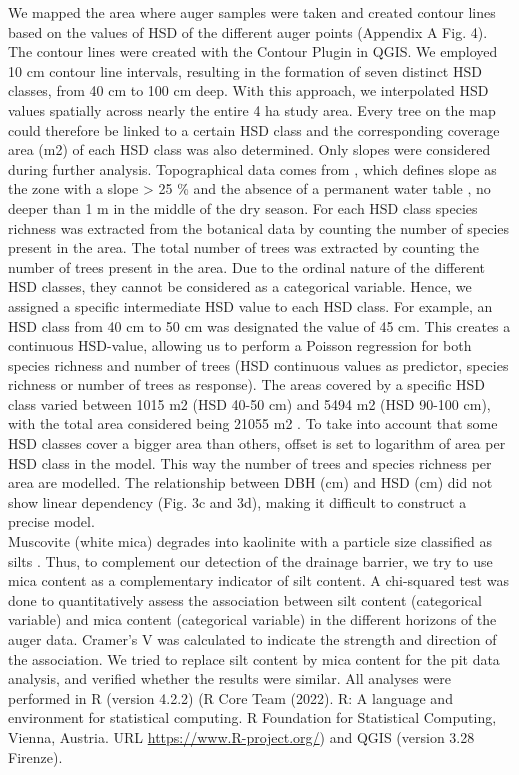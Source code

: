 \documentclass[fleqn,12pt]{latex/stylish_article} %
\begin{document}
We mapped the area where auger samples were taken and created contour lines based on the values of HSD of the different auger points (Appendix A Fig. 4). The contour lines were created with the Contour Plugin in QGIS. We employed 10 cm contour line intervals, resulting in the formation of seven distinct HSD classes, from 40 cm to 100 cm deep. With this approach, we interpolated HSD values spatially across nearly the entire 4 ha study area. Every tree on the map could therefore be linked to a certain HSD class and the corresponding coverage area (m2) of each HSD class was also determined.
Only slopes were considered during further analysis. Topographical data comes from \citep{dourdainGISDATADICTIONARY2022}, which defines slope as the zone with a slope \textgreater{} 25 \% and the absence of a permanent water table , no deeper than 1 m in the middle of the dry season. For each HSD class species richness was extracted from the botanical data by counting the number of species present in the area. The total number of trees was extracted by counting the number of trees present in the area. Due to the ordinal nature of the different HSD classes, they cannot be considered as a categorical variable. Hence, we assigned a specific intermediate HSD value to each HSD class. For example, an HSD class from 40 cm to 50 cm was designated the value of 45 cm. This creates a continuous HSD-value, allowing us to perform a Poisson regression for both species richness and number of trees (HSD continuous values as predictor, species richness or number of trees as response). The areas covered by a specific HSD class varied between 1015 m2 (HSD 40-50 cm) and 5494 m2 (HSD 90-100 cm), with the total area considered being 21055 m2 . To take into account that some HSD classes cover a bigger area than others, offset is set to logarithm of area per HSD class in the model. This way the number of trees and species richness per area are modelled. The relationship between DBH (cm) and HSD (cm) did not show linear dependency (Fig. 3c and 3d), making it difficult to construct a precise model.\\
Muscovite (white mica) degrades into kaolinite \citep{nicoliniEvidenceWeatheringStages2009} with a particle size classified as silts . Thus, to complement our detection of the drainage barrier, we try to use mica content as a complementary indicator of silt content. A chi-squared test was done to quantitatively assess the association between silt content (categorical variable) and mica content (categorical variable) in the different horizons of the auger data. Cramer's V was calculated to indicate the strength and direction of the association. We tried to replace silt content by mica content for the pit data analysis, and verified whether the results were similar.
All analyses were performed in R (version 4.2.2) (R Core Team (2022). R: A language and environment for statistical computing. R Foundation for Statistical Computing, Vienna, Austria. URL \url{https://www.R-project.org/}) and QGIS (version 3.28 Firenze).
\end{document}

